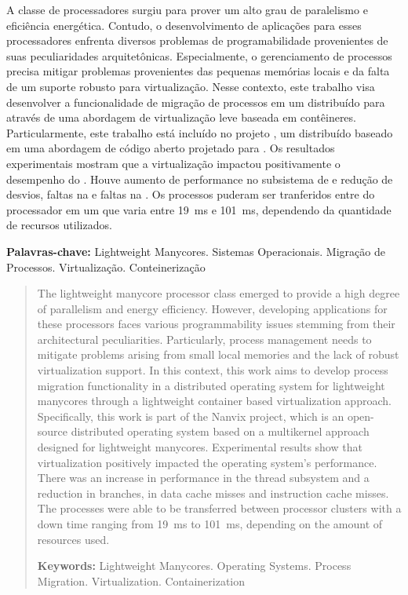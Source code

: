 \begin{resumo}[Resumo]
  A classe de processadores \lw surgiu para prover um alto grau de paralelismo e eficiência energética. Contudo, o desenvolvimento de aplicações para esses processadores enfrenta diversos problemas de programabilidade provenientes de suas peculiaridades arquitetônicas. Especialmente, o gerenciamento de processos precisa mitigar problemas provenientes das pequenas memórias locais e da falta de um suporte robusto para virtualização. Nesse contexto, este trabalho visa desenvolver a funcionalidade de migração de processos em um \os distribuído para \lws através de uma abordagem de virtualização leve baseada em contêineres. Particularmente, este trabalho está incluído no projeto \nanvix, um \os distribuído baseado em uma abordagem \multikernel de código aberto projetado para \lws. Os resultados experimentais mostram que a virtualização impactou positivamente o desempenho do \so. Houve aumento de performance no subsistema de \threads e redução de desvios, faltas na \dcache e faltas na \icache. Os processos puderam ser tranferidos entre \clusters do processador em um \downtime que varia entre 19~ms e 101~ms, dependendo da quantidade de recursos utilizados.

  \vspace{\baselineskip} 
  \textbf{Palavras-chave:} Lightweight Manycores. Sistemas Operacionais. Migração de Processos. Virtualização. Conteinerização
\end{resumo}

\begin{abstract}
  
The lightweight manycore processor class emerged to provide a high degree of parallelism and energy efficiency. However, developing applications for these processors faces various programmability issues stemming from their architectural peculiarities. Particularly, process management needs to mitigate problems arising from small local memories and the lack of robust virtualization support. In this context, this work aims to develop process migration functionality in a distributed operating system for lightweight manycores through a lightweight container based virtualization approach. Specifically, this work is part of the Nanvix project, which is an open-source  distributed operating system based on a multikernel approach designed for lightweight manycores. Experimental results show that virtualization positively impacted the operating system's performance. There was an increase in performance in the thread subsystem and a reduction in branches, in data cache misses and instruction cache misses. The processes were able to be transferred between processor clusters with a down time ranging from 19~ms to 101~ms, depending on the amount of resources used.

  \vspace{\baselineskip} 
  \textbf{Keywords:} Lightweight Manycores. Operating Systems. Process Migration. Virtualization. Containerization
\end{abstract}